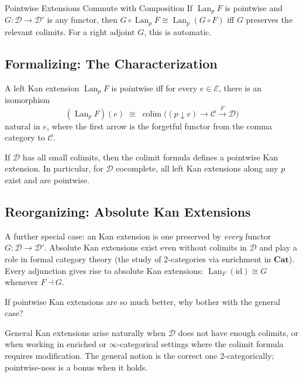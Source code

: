\begin{example}{Pointwise Extensions Commute with Composition}
If $\operatorname{Lan}_p F$ is pointwise and $G : \mathcal{D} \to \mathcal{D}'$
is any functor, then $G \circ \operatorname{Lan}_p F \cong \operatorname{Lan}_p (G \circ F)$
iff $G$ preserves the relevant colimits. For a right adjoint $G$, this is
automatic.
\end{example}

\subsection{Formalizing: The Characterization}

\begin{theorem}
\label{thm:pointwise-kan}
A left Kan extension $\operatorname{Lan}_p F$ is pointwise iff for every
$e \in \mathcal{E}$, there is an isomorphism
\begin{equation*}
  (\operatorname{Lan}_p F)(e) \;\cong\; \operatorname{colim}\bigl(
    (p \downarrow e) \to \mathcal{C} \xrightarrow{F} \mathcal{D}
  \bigr)
\end{equation*}
natural in $e$, where the first arrow is the forgetful functor from the comma
category to $\mathcal{C}$.
\end{theorem}

\begin{corollary}
If $\mathcal{D}$ has all small colimits, then the colimit formula defines a
pointwise Kan extension. In particular, for $\mathcal{D}$ cocomplete, all left
Kan extensions along any $p$ exist and are pointwise.
\end{corollary}

\subsection{Reorganizing: Absolute Kan Extensions}

A further special case: an  Kan extension is one preserved by
\emph{every} functor $G : \mathcal{D} \to \mathcal{D}'$. Absolute Kan extensions
exist even without colimits in $\mathcal{D}$ and play a role in formal category
theory (the study of 2-categories via enrichment in $\mathbf{Cat}$). Every
adjunction gives rise to absolute Kan extensions: $\operatorname{Lan}_F(\mathrm{id})
\cong G$ whenever $F \dashv G$.

\begin{dialog}
If pointwise Kan extensions are so much better, why bother with the general case?

General Kan extensions arise naturally when $\mathcal{D}$ does not have enough
colimits, or when working in enriched or $\infty$-categorical settings where the
colimit formula requires modification. The general notion is the correct one
2-categorically; pointwise-ness is a bonus when it holds.
\end{dialog}


